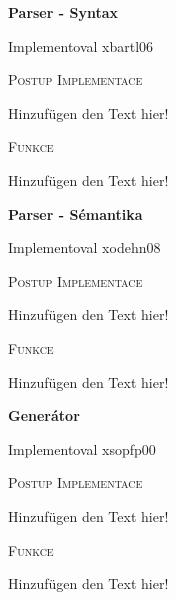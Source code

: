 \documentclass[12pt,a4paper]{report}
\begin{document}
{\huge\bfseries Parser - Syntax \par}
Implementoval xbartl06
\vspace{1cm}

{\scshape\Large Postup Implementace\par}
\vspace{0.3cm}
\noindent Hinzufügen den Text hier!
\vspace{1cm}

{\scshape\Large Funkce\par}
\vspace{0.3cm}
\noindent Hinzufügen den Text hier!
\newpage



{\huge\bfseries Parser - Sémantika \par}
Implementoval xodehn08
\vspace{1cm}

{\scshape\Large Postup Implementace\par}
\vspace{0.3cm}
\noindent Hinzufügen den Text hier!
\vspace{1cm}

{\scshape\Large Funkce\par}
\vspace{0.3cm}
\noindent Hinzufügen den Text hier!
\newpage



{\huge\bfseries Generátor \par}
Implementoval xsopfp00
\vspace{1cm}

{\scshape\Large Postup Implementace\par}
\vspace{0.3cm}
\noindent Hinzufügen den Text hier!
\vspace{1cm}

{\scshape\Large Funkce\par}
\vspace{0.3cm}
\noindent Hinzufügen den Text hier!
\newpage
\end{document}
